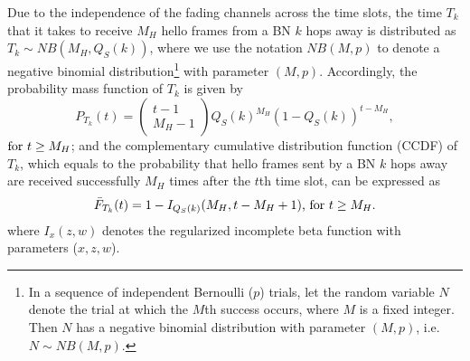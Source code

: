 \documentclass[10pt,english,two column]{IEEEtran}
\begin{document}
Due to the independence of the fading channels across the time slots,
the time $T_{k}$ that it takes to receive $M_{H}$ hello frames from
a BN $k$ hops away is distributed as $T_{k}\sim NB(M_{H},Q_{S}(k))$,
where we use the notation $NB(M,p)$ to denote a negative binomial
distribution\footnote{In a sequence of independent Bernoulli ($p$) trials, let the random
variable $N$ denote the trial at which the $M$th success occurs,
where $M$ is a fixed integer. Then $N$ has a negative binomial distribution
\cite{Morris} with parameter $(M,p)$, i.e.$N\sim NB(M,p)$. } with parameter $(M,p)$. Accordingly, the probability mass function
of $T_{k}$ is given by \cite{Morris} 
\begin{equation}
P_{T_{k}}\left(t\right)=\left(\begin{array}{c}
t-1\\
M_{H}-1
\end{array}\right)Q_{S}(k)^{M_{H}}(1-Q_{S}\left(k\right))^{t-M_{H}},
\end{equation}
$\textrm{for \ensuremath{t\geq M_{H}}}$; and the complementary cumulative
distribution function (CCDF) of $T_{k}$, which equals to the probability
that hello frames sent by a BN $k$ hops away are received successfully
$M_{H}$ times after the $t$th time slot, can be expressed as \cite{Morris}
\begin{equation}
\bar{F}_{T_{k}}(t)=1-I_{Q_{S}(k)}(M_{H},t-M_{H}+1)\textrm{, for \ensuremath{t\geq M_{H}}}.\label{eq:CCDF_oneNode}
\end{equation}
where $I_{x}(z,w)$ denotes the regularized incomplete beta function
with parameters ($x,z,w$).
\end{document}
